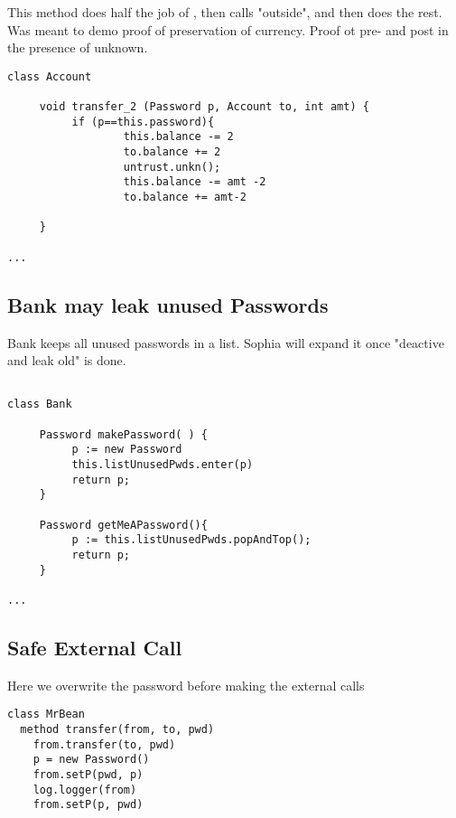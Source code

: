 This method  does half the job of  , then calls "outside", and then does the rest. Was meant to demo proof of preservation of currency. Proof ot pre- and post in the presence of unknown.

\begin{lstlisting}[language=chainmail, mathescape=true, frame=lines]
class Account

     void transfer_2 (Password p, Account to, int amt) {
          if (p==this.password){
                  this.balance -= 2
                  to.balance += 2
                  untrust.unkn();
                  this.balance -= amt -2
                  to.balance += amt-2
                     
     }
     
...
\end{lstlisting}

\subsection{Bank may leak unused Passwords}
\label{s:deactivate_leak_old}

Bank keeps all unused passwords in a list.  Sophia will expand it once "deactive and leak old" is done.

\begin{lstlisting}[language=chainmail, mathescape=true, frame=lines]

class Bank

     Password makePassword( ) {
          p := new Password
          this.listUnusedPwds.enter(p) 
          return p;                    
     }
     
     Password getMeAPassword(){
          p := this.listUnusedPwds.popAndTop();
          return p;
     }
     
...
\end{lstlisting}

\subsection{Safe External Call}
\label{s:safe:extern}

Here we overwrite the password before making the external calls

\begin{lstlisting}[language=chainmail, mathescape=true, frame=lines]
class MrBean
  method transfer(from, to, pwd)
    from.transfer(to, pwd)
    p = new Password()
    from.setP(pwd, p)
    log.logger(from)
    from.setP(p, pwd)
\end{lstlisting}


